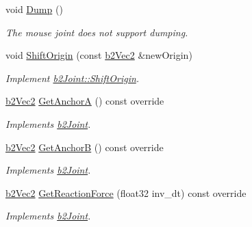 \begin{DoxyCompactItemize}
\item 
\mbox{\label{classb2MouseJoint_ae3d3a46a0032c0e50f346e7f7129617f}} 
void \hyperlink{classb2MouseJoint_ae3d3a46a0032c0e50f346e7f7129617f}{Dump} ()
\begin{DoxyCompactList}\small\item\em The mouse joint does not support dumping. \end{DoxyCompactList}\item 
\mbox{\label{classb2MouseJoint_aa3c46b204aea79822dd6c6843c361801}} 
void \hyperlink{classb2MouseJoint_aa3c46b204aea79822dd6c6843c361801}{Shift\+Origin} (const \hyperlink{structb2Vec2}{b2\+Vec2} \&new\+Origin)
\begin{DoxyCompactList}\small\item\em Implement \hyperlink{classb2Joint_a7804f649e993dc0fd9ae47fde5601f90}{b2\+Joint\+::\+Shift\+Origin}. \end{DoxyCompactList}\item 
\mbox{\label{classb2MouseJoint_a3c42531ac763bca3658a987d0ac7d2c4}} 
\hyperlink{structb2Vec2}{b2\+Vec2} \hyperlink{classb2MouseJoint_a3c42531ac763bca3658a987d0ac7d2c4}{Get\+AnchorA} () const override
\begin{DoxyCompactList}\small\item\em Implements \hyperlink{classb2Joint}{b2\+Joint}. \end{DoxyCompactList}\item 
\mbox{\label{classb2MouseJoint_adecfaff123ba199f9fc80be7fcb74af2}} 
\hyperlink{structb2Vec2}{b2\+Vec2} \hyperlink{classb2MouseJoint_adecfaff123ba199f9fc80be7fcb74af2}{Get\+AnchorB} () const override
\begin{DoxyCompactList}\small\item\em Implements \hyperlink{classb2Joint}{b2\+Joint}. \end{DoxyCompactList}\item 
\mbox{\label{classb2MouseJoint_a1af7bb9f41076b29a1ddefd7b6c2f27b}} 
\hyperlink{structb2Vec2}{b2\+Vec2} \hyperlink{classb2MouseJoint_a1af7bb9f41076b29a1ddefd7b6c2f27b}{Get\+Reaction\+Force} (float32 inv\+\_\+dt) const override
\begin{DoxyCompactList}\small\item\em Implements \hyperlink{classb2Joint}{b2\+Joint}. \end{DoxyCompactList}\item 

\end{DoxyCompactItemize}
